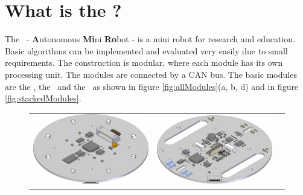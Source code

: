 \chapter{What is the \amiro ?}

The \amiro\ - {\bf A}utonomous {\bf Mi}ni {\bf Ro}bot - is a mini robot for research and education. Basic algorithms can be implemented and evaluated very easily due to small requirements. The construction is modular, where each module has its own processing unit. The modules are connected by a CAN bus. The basic modules are the \diwheel, the \power\ and the \light\ as shown in figure \ref{fig:allModules}(a, b, d) and in figure \ref{fig:stackedModules}.

\begin{figure}[htb]
\begin{center}
\begin{tabular}{ccc}
\includegraphics[scale=1.5]{Bilder/boardpics/lightring.png} &
\includegraphics[scale=1.5]{Bilder/boardpics/diwheeldrive.png} &

\end{tabular}
\end{center}
\end{figure}
